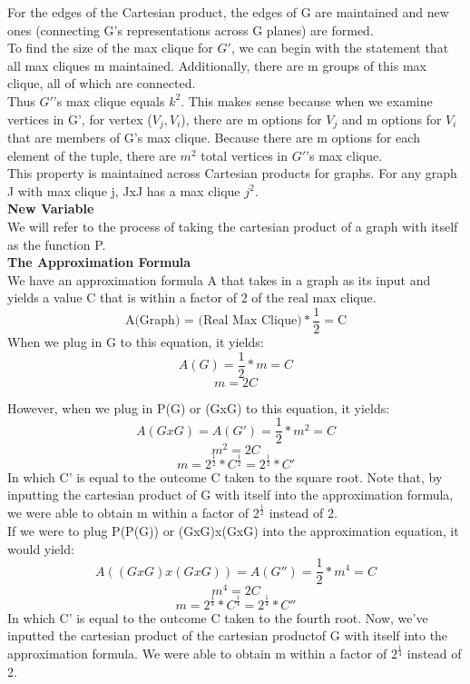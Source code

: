 \documentclass[11pt, solution, letterpaper]{format}
\begin{document}
For the edges of the Cartesian product, the edges of G are maintained and new ones (connecting G's representations across G planes) are formed. \\

To find the size of the max clique for $G'$, we can begin with the statement that all max cliques m maintained. Additionally, there are m groups of this max clique, all of which are connected.\\

Thus $G'$'s max clique equals $k^2$. This makes sense because when we examine vertices in G', for vertex ($V_j, V_i$), there are m options for $V_j$ and m options for $V_i$ that are members of G's max clique. Because there are m options for each element of the tuple, there are $m^2$ total vertices in $G'$'s max clique. \\

This property is maintained across Cartesian products for graphs.  For any graph J with max clique j, JxJ has a max clique $j^2$.\\

\textbf{New Variable}\\
We will refer to the process of taking the cartesian product of a graph with itself as the function P. \\

\textbf{The Approximation Formula}\\
We have an approximation formula A that takes in a graph as its input and yields a value C that is within a factor of 2 of the real max clique.\\
$$\text{A(Graph) = (Real Max Clique)} * \frac{1}{2} = \text{C}$$
When we plug in G to this equation, it yields:\\
$$A(G) = \frac{1}{2}*m = C$$
$$m = 2C$$

However, when we plug in P(G) or (GxG) to this equation, it yields:\\
$$A(G x G) = A(G') = \frac{1}{2}*m^2 = C$$
$$m^2 = 2C$$
$$m = 2^\frac{1}{2} * C^\frac{1}{2} =  2^\frac{1}{2} * C'$$
In which C' is equal to the outcome C taken to the square root.
Note that, by inputting the cartesian product of G with itself into the approximation formula, we were able to obtain m within a factor of $2^\frac{1}{2}$ instead of 2. \\

If we were to plug P(P(G)) or (GxG)x(GxG) into the approximation equation, it would yield:\\
$$A((G x G)x(G x G)) = A(G'') = \frac{1}{2}*m^4 = C$$
$$m^4 = 2C$$
$$m = 2^\frac{1}{4} * C^\frac{1}{4} =  2^\frac{1}{4} * C''$$
In which C' is equal to the outcome C taken to the fourth root.
Now, we've inputted the cartesian product of the cartesian productof G with itself into the approximation formula. We were able to obtain m within a factor of $2^\frac{1}{4}$ instead of 2. \\
\end{document}
